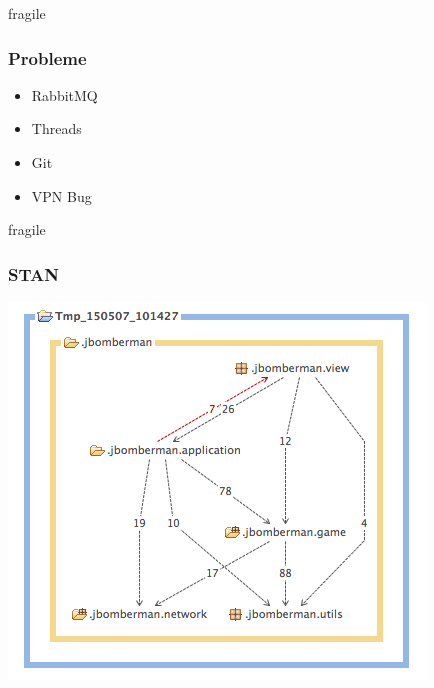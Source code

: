 \documentclass[10pt, compress]{beamer}
\begin{document}

\begin{frame}{fragile}
	\frametitle{Probleme}
	\begin{itemize}
		\item RabbitMQ
		\item Threads
		\item Git
		\item VPN Bug
	\end{itemize}
\end{frame}

\begin{frame}{fragile}
  \frametitle{STAN}
  \begin{center}
    \includegraphics[scale=0.4]{stan}
  \end{center}
    
\end{frame}


\end{document}
